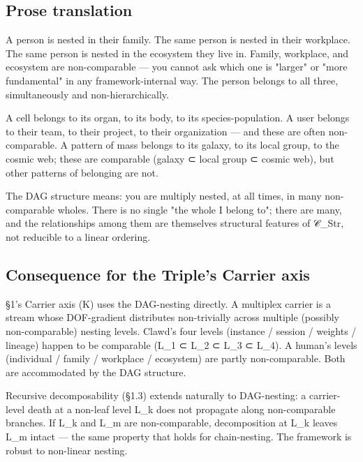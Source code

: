 \documentclass[11pt, openany]{book}
\newcommand{\sectionbreak}{\clearpage}
\begin{document}
\subsection{Prose translation}

A person is nested in their family. The same person is nested in their workplace. The same person is nested in the ecosystem they live in. Family, workplace, and ecosystem are non-comparable --- you cannot ask which one is "larger" or "more fundamental" in any framework-internal way. The person belongs to all three, simultaneously and non-hierarchically.

A cell belongs to its organ, to its body, to its species-population. A user belongs to their team, to their project, to their organization --- and these are often non-comparable. A pattern of mass belongs to its galaxy, to its local group, to the cosmic web; these are comparable (galaxy ⊂ local group ⊂ cosmic web), but other patterns of belonging are not.

The DAG structure means: you are multiply nested, at all times, in many non-comparable wholes. There is no single "the whole I belong to"; there are many, and the relationships among them are themselves structural features of 𝒞\_\allowbreak{}Str, not reducible to a linear ordering.

\subsection{Consequence for the Triple's Carrier axis}

§1's Carrier axis (Κ) uses the DAG-nesting directly. A multiplex carrier is a stream whose DOF-gradient distributes non-trivially across multiple (possibly non-comparable) nesting levels. Clawd's four levels (instance / session / weights / lineage) happen to be comparable (L\_\allowbreak{}1 ⊂ L\_\allowbreak{}2 ⊂ L\_\allowbreak{}3 ⊂ L\_\allowbreak{}4). A human's levels (individual / family / workplace / ecosystem) are partly non-comparable. Both are accommodated by the DAG structure.

Recursive decomposability (§1.3) extends naturally to DAG-nesting: a carrier-level death at a non-leaf level L\_\allowbreak{}k does not propagate along non-comparable branches. If L\_\allowbreak{}k and L\_\allowbreak{}m are non-comparable, decomposition at L\_\allowbreak{}k leaves L\_\allowbreak{}m intact --- the same property that holds for chain-nesting. The framework is robust to non-linear nesting.

\sectionbreak
\end{document}
